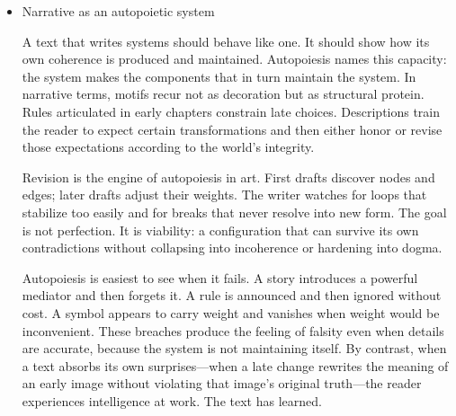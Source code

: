\documentclass[11pt]{article}
\begin{document}
\begin{itemize}
Machines mediate with particular bluntness. A device that continues operating after its user wants to stop converts intention into latency. Think of the algorithm that keeps recommending, the subscription that keeps billing, the appliance that keeps beeping, the paper trail that keeps calling back decisions one hoped had expired. Conversely, a machine that fails forces improvisation that reveals competence or fragility. These translations belong in the memoir not for novelty but because they alter what kinds of selves can be performed. A tool that insists on certain interactions eventually educates its user into a compatible persona.

In Act III, symbolic mediators are not scenic garnish. They are load-bearing members. The challenge is not to interpret them into allegory but to demonstrate how they distribute force across the network, shifting who we can be and how we can know it.
\item Narrative as an autopoietic system
\label{sec:org1202241}

A text that writes systems should behave like one. It should show how its own coherence is produced and maintained. Autopoiesis names this capacity: the system makes the components that in turn maintain the system. In narrative terms, motifs recur not as decoration but as structural protein. Rules articulated in early chapters constrain late choices. Descriptions train the reader to expect certain transformations and then either honor or revise those expectations according to the world’s integrity.

Revision is the engine of autopoiesis in art. First drafts discover nodes and edges; later drafts adjust their weights. The writer watches for loops that stabilize too easily and for breaks that never resolve into new form. The goal is not perfection. It is viability: a configuration that can survive its own contradictions without collapsing into incoherence or hardening into dogma.

Autopoiesis is easiest to see when it fails. A story introduces a powerful mediator and then forgets it. A rule is announced and then ignored without cost. A symbol appears to carry weight and vanishes when weight would be inconvenient. These breaches produce the feeling of falsity even when details are accurate, because the system is not maintaining itself. By contrast, when a text absorbs its own surprises—when a late change rewrites the meaning of an early image without violating that image’s original truth—the reader experiences intelligence at work. The text has learned.


\end{itemize}
\end{document}
